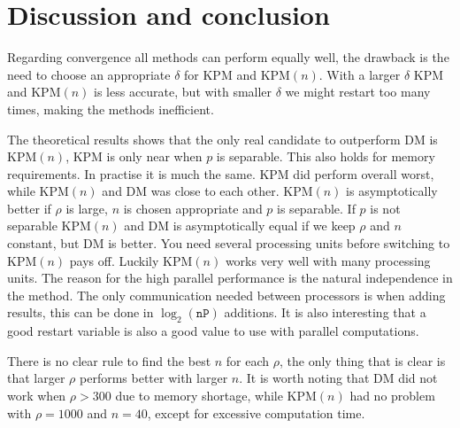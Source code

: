 \chapter{Discussion and conclusion}%
Regarding convergence all methods can perform equally well, the drawback is the need to choose an appropriate $\delta$ for KPM and KPM$(n)$. With a larger $\delta$ KPM and KPM$(n)$ is less accurate, but with smaller $\delta$ we might restart too many times, making the methods inefficient. 


The theoretical results shows that the only real candidate to outperform DM is KPM$(n)$, KPM is only near when $p$ is separable. This also holds for memory requirements. In practise it is much the same. KPM did perform overall worst, while KPM$(n)$ and DM was close to each other. KPM$(n)$ is asymptotically better if $\rho$ is large, $n$ is chosen appropriate and $p$ is separable. If $p$ is not separable  KPM$(n)$ and DM is asymptotically equal if we keep $\rho$ and $n$ constant, but DM is better. You need several processing units before switching to KPM$(n)$ pays off. Luckily KPM$(n)$ works very well with many processing units. The reason for the high parallel performance is the natural independence in the method. The only communication needed between processors is when adding results, this can be done in $\log_2(\texttt{nP})$ additions. It is also interesting that a good restart variable is also a good value to use with parallel computations.



There is no clear rule to find the best $n$ for each $\rho$, the only thing that is clear is that larger $\rho$ performs better with larger $n$. It is worth noting that DM did not work when $\rho>300$ due to memory shortage, while KPM$(n)$ had no problem with $\rho = 1000$ and $n = 40$, except for excessive computation time. \\




